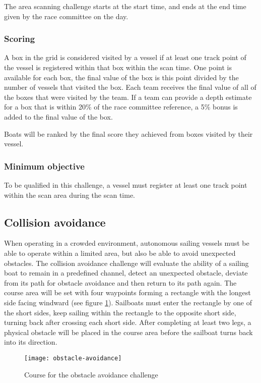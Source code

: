 \documentclass[12pt]{article}
\begin{document}
The area scanning challenge starts at the start time, and ends at the end
time given by the race committee on the day.

\subsubsection{Scoring}

A box in the grid is considered visited by a vessel if at least one track point
of the vessel is registered within that box within the scan time.
One point is available for each box, the final value of the box is this point 
divided by the number of vessels that visited the box. 
Each team receives the final value of all of the boxes that were visited by the
team. If a team can provide a depth estimate for a box that is within 20\% of
the race committee reference, a 5\% bonus is added to 
the final value of the box.

Boats will be ranked by the final score they achieved from boxes visited by
their vessel.

\subsubsection{Minimum objective}
To be qualified in this challenge, a vessel must register at least one track
point within the scan area during the scan time.

\subsection{Collision avoidance}
When operating in a crowded environment, autonomous sailing vessels must be able
to operate within a limited area, but also be able to avoid unexpected
obstacles. The collision avoidance challenge will evaluate the ability of a 
sailing boat to remain in a predefined channel, detect an unexpected obstacle, 
deviate from its path for obstacle avoidance and then return to its path again.
 The course area will be set with four waypoints forming a rectangle with the 
 longest side facing windward (see figure \ref{fig:obstacleavoidance}). 
Sailboats must enter the rectangle by one of the short sides, keep
sailing within the
rectangle to the opposite short side, turning back after crossing each short
side. After
completing at least two legs, a physical obstacle will be placed in the course
area before the
sailboat turns back into its direction.


  \begin{figure}[H]
    \centering
    \texttt{[image: obstacle-avoidance]}
    \caption{Course for the obstacle avoidance challenge}
    \label{fig:obstacleavoidance}
  \end{figure}
\end{document}
